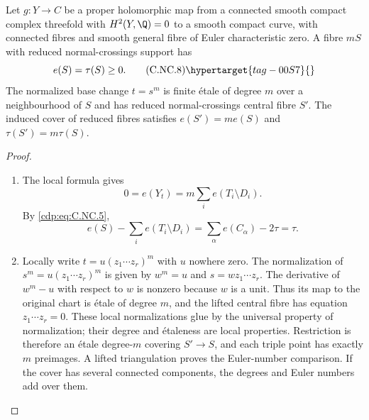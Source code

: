 \begin{proposition}\hypertarget{tag-01CA}{}\label{cdp:st:C.2.NC.3}

Let $g:Y\to C$ be a proper holomorphic map from a connected smooth compact complex threefold with $H^2(Y,\Q)=0$ to a smooth compact curve, with connected fibres and smooth general fibre of Euler characteristic zero. A fibre $mS$ with reduced normal-crossings support has
\[
 e(S)=\tau(S)\ge0.
 \tag{C.NC.8}\hypertarget{tag-00S7}{}\label{cdp:eq:C.NC.8}
\]
The normalized base change $t=s^m$ is finite étale of degree $m$ over a neighbourhood of $S$ and has reduced normal-crossings central fibre $S'$. The induced cover of reduced fibres satisfies
$e(S')=m e(S)$ and $\tau(S')=m\tau(S)$.
\end{proposition}


\begin{proof}

\begin{enumerate}[label=\arabic*.,leftmargin=*]
\item The local formula  gives
\[
 0=e(Y_t)=m\sum_i e(T_i\setminus D_i).
\]
By \eqref{cdp:eq:C.NC.5},
\[
 e(S)-\sum_i e(T_i\setminus D_i)
 =\sum_\alpha e(C_\alpha)-2\tau=\tau.
\]

\item Locally write $t=u(z_1\cdots z_r)^m$ with $u$ nowhere zero. The normalization of $s^m=u(z_1\cdots z_r)^m$ is given by
$w^m=u$ and $s=wz_1\cdots z_r$.
The derivative of $w^m-u$ with respect to $w$ is nonzero because $w$ is a unit. Thus its map to the original chart is étale of degree $m$, and the lifted central fibre has equation $z_1\cdots z_r=0$. These local normalizations glue by the universal property of normalization; their degree and étaleness are local properties. Restriction is therefore an étale degree-$m$ covering $S'\to S$, and each triple point has exactly $m$ preimages. A lifted triangulation proves the Euler-number comparison. If the cover has several connected components, the degrees and Euler numbers add over them.

\end{enumerate}
\end{proof}